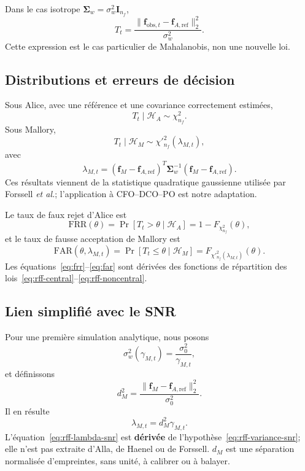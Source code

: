 \documentclass[conference,a4paper]{IEEEtran}
\newcommand{\FAR}{\mathrm{FAR}}
\newcommand{\FRR}{\mathrm{FRR}}
\begin{document}
Dans le cas isotrope $\boldsymbol\Sigma_w=\sigma_w^2\mathbf I_{n_f}$,
\begin{equation}
T_t=\frac{\|\mathbf f_{\mathrm{obs},t}-\mathbf f_{A,\mathrm{ref}}\|_2^2}{\sigma_w^2}.
\end{equation}
Cette expression est le cas particulier de Mahalanobis, non une nouvelle loi.

\subsection{Distributions et erreurs de décision}
Sous Alice, avec une référence et une covariance correctement estimées,
\begin{equation}
    T_t\mid\mathcal H_A\sim\chi^2_{n_f}.
    \label{eq:rff-central}
\end{equation}
Sous Mallory,
\begin{equation}
    T_t\mid\mathcal H_M\sim\chi'^2_{n_f}(\lambda_{M,t}),
    \label{eq:rff-noncentral}
\end{equation}
avec
\begin{equation}
\lambda_{M,t}=(\mathbf f_M-\mathbf f_{A,\mathrm{ref}})^T
\boldsymbol\Sigma_w^{-1}
(\mathbf f_M-\mathbf f_{A,\mathrm{ref}}).
\label{eq:rff-lambda}
\end{equation}
Ces résultats viennent de la statistique quadratique gaussienne utilisée par Forssell \emph{et al.}; l'application à CFO--DCO--PO est notre adaptation.

Le taux de faux rejet d'Alice est
\begin{equation}
\FRR(\theta)=\Pr[T_t>\theta\mid\mathcal H_A]
=1-F_{\chi^2_{n_f}}(\theta),
\label{eq:frr}
\end{equation}
et le taux de fausse acceptation de Mallory est
\begin{equation}
\FAR(\theta,\lambda_{M,t})=\Pr[T_t\leq\theta\mid\mathcal H_M]
=F_{\chi'^2_{n_f}(\lambda_{M,t})}(\theta).
\label{eq:far}
\end{equation}
Les équations~\eqref{eq:frr}--\eqref{eq:far} sont dérivées des fonctions de répartition des lois~\eqref{eq:rff-central}--\eqref{eq:rff-noncentral}.

\subsection{Lien simplifié avec le SNR}
Pour une première simulation analytique, nous posons
\begin{equation}
    \sigma_w^2(\gamma_{M,t})=\frac{\sigma_0^2}{\gamma_{M,t}},
    \label{eq:rff-variance-snr}
\end{equation}
et définissons
\begin{equation}
    d_M^2=\frac{\|\mathbf f_M-\mathbf f_{A,\mathrm{ref}}\|_2^2}{\sigma_0^2}.
\end{equation}
Il en résulte
\begin{equation}
    \lambda_{M,t}=d_M^2\gamma_{M,t}.
    \label{eq:rff-lambda-snr}
\end{equation}
L'équation~\eqref{eq:rff-lambda-snr} est \textbf{dérivée} de l'hypothèse~\eqref{eq:rff-variance-snr}; elle n'est pas extraite d'Alla, de Haenel ou de Forssell. $d_M$ est une séparation normalisée d'empreintes, sans unité, à calibrer ou à balayer.
\end{document}
